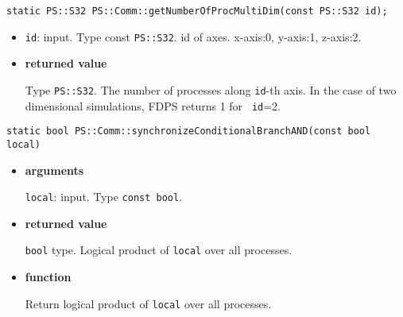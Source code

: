 
\begin{screen}
\begin{verbatim}
static PS::S32 PS::Comm::getNumberOfProcMultiDim(const PS::S32 id);
\end{verbatim}
\end{screen}

\begin{itemize}

\item{\bf }

{\tt id}: input. Type const {\tt PS::S32}. id of axes. x-axis:0,
y-axis:1, z-axis:2.


\item{\bf returned value}

Type {\tt PS::S32}. The number of processes along {\tt id}-th axis.
In the case of two dimensional simulations, FDPS returns 1 for {\tt
id}=2.


\end{itemize}


\begin{screen}
\begin{verbatim}
static bool PS::Comm::synchronizeConditionalBranchAND(const bool local)
\end{verbatim}
\end{screen}

\begin{itemize}

\item{\bf arguments}

{\tt local}: input. Type {\tt const bool}.


\item{\bf returned value}

{\tt bool} type. Logical product of {\tt local} over all processes.

\item{\bf function}

Return logical product of {\tt local} over all processes.

\end{itemize}

